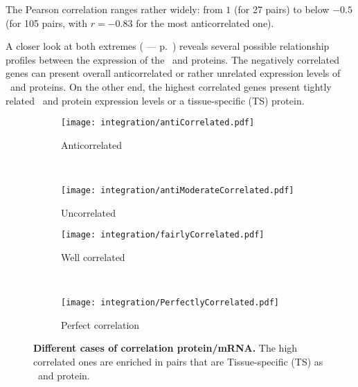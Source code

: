 The Pearson correlation ranges rather widely:
from $1$ (for 27 pairs)
to below $-0.5$ (for 105 pairs,
with $r=-0.83$ for the  most anticorrelated one).\mybr\

A closer look at both extremes ( --- p.~\pageref{fig:caseGene})
reveals several possible relationship profiles
between the expression of the \mRNAs\ and proteins.
The negatively correlated genes can present
overall anticorrelated or rather unrelated expression levels
of \mRNAs\ and proteins.
On the other end,
the highest correlated genes present
tightly related \mRNA\ and protein expression levels
or a tissue-specific (\gls{TS}) protein.

\begin{figure}[!htb]
    \begin{subfigure}[h]{0.5\textwidth}
        \centering \texttt{[image: integration/antiCorrelated.pdf]}
        \caption{Anticorrelated}\label{fig:caseAnticor}
    \end{subfigure}~%
    \begin{subfigure}[h]{0.5\textwidth}
        \centering \texttt{[image: integration/antiModerateCorrelated.pdf]}
        \caption{Uncorrelated}\label{fig:caseUncor}
    \end{subfigure}
    \vspace{2mm}

    \begin{subfigure}[h]{0.5\textwidth}
        \centering \texttt{[image: integration/fairlyCorrelated.pdf]}
        \caption{Well correlated}\label{fig:caseFairlyCor}
    \end{subfigure}~%
    \begin{subfigure}[h]{0.5\textwidth}
        \centering \texttt{[image: integration/PerfectlyCorrelated.pdf]}
        \caption{Perfect correlation}\label{fig:casePerfectlyCor}
    \end{subfigure}
    \caption[Different cases of correlation
    protein/mRNA]{\label{fig:caseGene}\textbf{Different cases of correlation
    protein/mRNA.} The high correlated ones are enriched in pairs that are
    Tissue-specific (TS) as \mRNA\ and protein.}
\end{figure}

